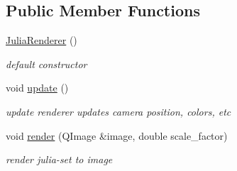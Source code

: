 \subsection*{Public Member Functions}
\begin{DoxyCompactItemize}
\item 
\mbox{\label{classJuliaRenderer_a6fc0f5a07835264e53ba7dea9a6562a4}} 
\hyperlink{classJuliaRenderer_a6fc0f5a07835264e53ba7dea9a6562a4}{Julia\+Renderer} ()
\begin{DoxyCompactList}\small\item\em default constructor \end{DoxyCompactList}\item 
\mbox{\label{classJuliaRenderer_affd048fa174855e27db9453eda38d2ba}} 
void \hyperlink{classJuliaRenderer_affd048fa174855e27db9453eda38d2ba}{update} ()
\begin{DoxyCompactList}\small\item\em update renderer updates camera position, colors, etc \end{DoxyCompactList}\item 
void \hyperlink{classJuliaRenderer_a2231caba8e65e19eb3074670c96e705f}{render} (Q\+Image \&image, double scale\+\_\+factor)
\begin{DoxyCompactList}\small\item\em render julia-\/set to image \end{DoxyCompactList}\end{DoxyCompactItemize}
